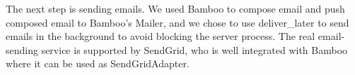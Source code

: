 The next step is sending emails. We used Bamboo to compose 
email and push composed email to Bamboo's Mailer, and we 
chose to use deliver\_later to send emails in the background 
to avoid blocking the server process. The real email-sending 
service is supported by SendGrid, who is well integrated with 
Bamboo where it can be used as SendGridAdapter.

